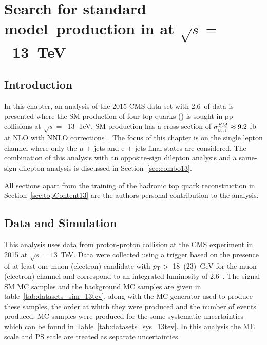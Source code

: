 \chapter{Search for standard model~\tttt production in \runtwo at $\sqrt{s} =$~13~TeV \label{c:Run2}}
\section{Introduction}
In this chapter, an analysis of the 2015 CMS data set with 2.6~\fbinv of data is presented where the SM production of four top quarks (\tttt) is sought in pp collisions at $\sqrt{s} =$~13~TeV. SM \tttt production has a cross section of $\sigma_{{\mathrm{t}\overline{\mathrm{t}}\mathrm{t}\overline{\mathrm{t}}}}^{SM}  \approx 9.2$ fb at NLO with NNLO corrections~\cite{Alwall2014,Bevilacqua2012}. The focus of this chapter is on the single lepton channel where only the $\mu$ + jets and e + jets final states are considered. The combination of this analysis with an opposite-sign dilepton analysis and a same-sign dilepton analysis is discussed in Section~\ref{sec:combo13}.

All sections apart from the training of the hadronic top quark reconstruction in Section~\ref{sec:topContent13} are the authors personal contribution to the analysis.

\section{Data and Simulation}
\label{sec:datasimulation13}
This analysis uses data from proton-proton collision at the CMS experiment in 2015 at $\sqrt{s}=13$~TeV.
Data were collected using a trigger based on the presence of at least one muon (electron) candidate with $p_{\mathrm{T}} > $~18~(23)~GeV for the muon (electron) channel and correspond to an integrated luminosity of 2.6~\fbinv .
The signal SM \tttt MC samples and the background MC samples are given in table~\ref{tab:datasets_sim_13tev}, along with the MC generator used to produce these samples, the order at which they were produced and the number of events produced. MC samples were produced for the some systematic uncertainties which can be found in Table~\ref{tab:datasets_sys_13tev}. In this analysis the ME scale and PS scale are treated as separate uncertainties.

